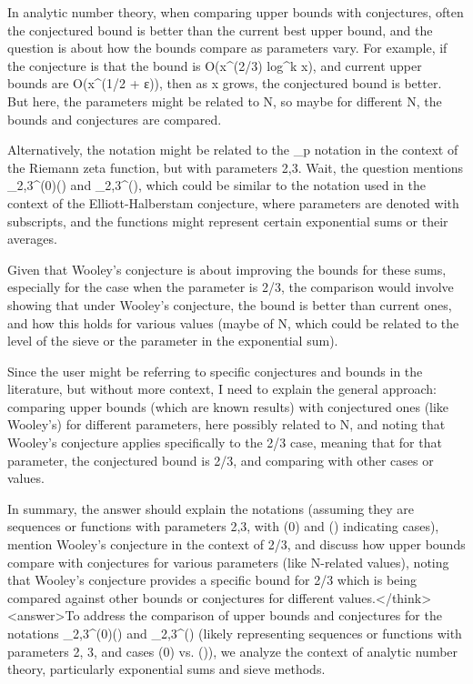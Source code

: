 In analytic number theory, when comparing upper bounds with conjectures, often the conjectured bound is better than the current best upper bound, and the question is about how the bounds compare as parameters vary. For example, if the conjecture is that the bound is O(x^(2/3) log^k x), and current upper bounds are O(x^(1/2 + ε)), then as x grows, the conjectured bound is better. But here, the parameters might be related to N, so maybe for different N, the bounds and conjectures are compared. 

Alternatively, the notation might be related to the _p notation in the context of the Riemann zeta function, but with parameters 2,3. Wait, the question mentions _2,3^(0)() and _2,3^(), which could be similar to the notation used in the context of the Elliott-Halberstam conjecture, where parameters are denoted with subscripts, and the functions might represent certain exponential sums or their averages. 

Given that Wooley's conjecture is about improving the bounds for these sums, especially for the case when the parameter is 2/3, the comparison would involve showing that under Wooley's conjecture, the bound is better than current ones, and how this holds for various values (maybe of N, which could be related to the level of the sieve or the parameter in the exponential sum). 

Since the user might be referring to specific conjectures and bounds in the literature, but without more context, I need to explain the general approach: comparing upper bounds (which are known results) with conjectured ones (like Wooley's) for different parameters, here possibly related to N, and noting that Wooley's conjecture applies specifically to the 2/3 case, meaning that for that parameter, the conjectured bound is 2/3, and comparing with other cases or values. 

In summary, the answer should explain the notations (assuming they are sequences or functions with parameters 2,3, with (0) and () indicating cases), mention Wooley's conjecture in the context of 2/3, and discuss how upper bounds compare with conjectures for various parameters (like N-related values), noting that Wooley's conjecture provides a specific bound for 2/3 which is being compared against other bounds or conjectures for different values.</think><answer>To address the comparison of upper bounds and conjectures for the notations _2,3^(0)() and _2,3^() (likely representing sequences or functions with parameters 2, 3, and cases (0) vs. ()), we analyze the context of analytic number theory, particularly exponential sums and sieve methods.  

